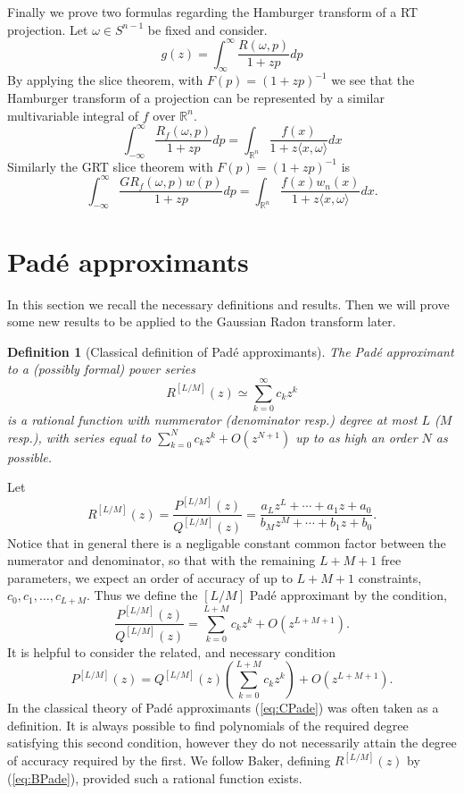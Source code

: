 \documentclass{amsart}
\newtheorem{definition}[theorem]{Definition}
\theoremstyle{remark}
\numberwithin{equation}{section}
\newcommand{\RR}{\mathbb{R}}
\begin{document}
Finally we prove two formulas regarding the Hamburger transform of a RT projection. Let $\omega \in S^{n-1}$ be fixed and consider.
\[
    g(z) = \int_\infty^\infty \frac{R(\omega, p)}{1 + zp} dp
\]
By applying the slice theorem, with $F(p) = (1+zp)^{-1}$ we see that the Hamburger transform of a projection can be represented by a similar multivariable integral of $f$ over $\RR^n$.
\[
    \int_{-\infty}^\infty \frac{R_f(\omega, p)}{1 + zp} dp = \int_{\RR^n} \frac{f(x)}{1 + z\langle x, \omega \rangle} dx
\]
Similarly the GRT slice theorem with $F(p) = (1 + zp)^{-1}$ is
\[
    \int_{-\infty}^\infty \frac{GR_f(\omega, p) w(p)}{1 + zp} dp = \int_{\RR^n} \frac{f(x)w_n(x)}{1 + z\langle x, \omega \rangle} dx.
\]




\section{Pad\'e approximants}

In this section we recall the necessary definitions and results. Then we will prove some new results to be applied to the Gaussian Radon transform later.

\begin{definition}[Classical definition of Pad\'e approximants]
The Pad\'e approximant to a (possibly formal) power series 
\[
    R^{[L/M]}(z) \simeq \sum_{k=0}^\infty c_k z^k
\]
is a rational function with nummerator (denominator resp.) degree at most $L$ ($M$ resp.), with series equal to $\sum_{k=0}^N c_k z^k + O(z^{N+1})$ up to as high an order $N$ as possible. 
\end{definition}
Let
\[
    R^{[L/M]}(z) = \frac{P^{[L/M]}(z)}{Q^{[L/M]}(z)} = \frac{a_Lz^L + \cdots + a_1z + a_0}{b_Mz^M + \cdots + b_1z + b_0}.
\]
Notice that in general there is a negligable constant common factor between the numerator and denominator, so that with the remaining $L+M+1$ free parameters, we expect an order of accuracy of up to $L+M+1$ constraints, $c_0, c_1, \ldots, c_{L+M}$. Thus we define the $[L/M]$ Pad\'e approximant by the condition,
\begin{equation}
    \label{eq:BPade}
    \frac{P^{[L/M]}(z)}{Q^{[L/M]}(z)} = \sum_{k=0}^{L+M} c_k z^k + O\left(z^{L+M+1}\right).
\end{equation}
It is helpful to consider the related, and necessary condition
\begin{equation}
    \label{eq:CPade}
    P^{[L/M]}(z) = Q^{[L/M]}(z)\left(\sum_{k=0}^{L+M} c_k z^k\right) + O\left(z^{L+M+1}\right).
\end{equation}
In the classical theory of Pad\'e approximants (\ref{eq:CPade}) was often taken as a definition. It is always possible to find polynomials of the required degree satisfying this second condition, however they do not necessarily attain the degree of accuracy required by the first. We follow Baker, defining $R^{[L/M]}(z)$ by (\ref{eq:BPade}), provided such a rational function exists.
\end{document}
